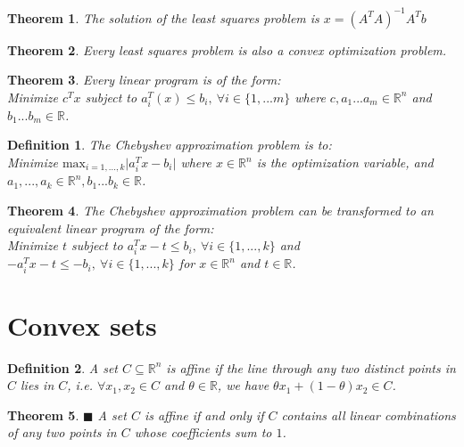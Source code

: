 \documentclass[a4paper]{article}
\newtheorem{mytheorem}{Theorem}
\newtheorem{mydef}{Definition}
\numberwithin{mytheorem}{section}
\numberwithin{mydef}{section}
\numberwithin{example}{section}
\newcommand{\done}{$\blacksquare$ }
\begin{document}
\begin{mytheorem} The solution of the least squares problem is $x = (A^{T}A)^{-1}A^{T}b$ \end{mytheorem}

\begin{mytheorem} Every least squares problem is also a convex optimization problem. \end{mytheorem}

\begin{mytheorem} Every linear program is of the form: \\
Minimize $c^{T}x$ subject to $a^{T}_{i}(x) \leq b_{i}, \ \forall i \in \{1,...m\}$ where $c,a_{1}...a_{m} \in \mathbb{R}^{n}$ and $b_{1}...b_{m} \in \mathbb{R}$. 
\end{mytheorem}

\begin{mydef} The Chebyshev approximation problem is to: \\
Minimize $\text{max}_{i=1,...,k} \lvert a^{T}_{i}x-b_{i}\rvert$ where $x \in \mathbb{R}^{n}$ is the optimization variable, and $a_{1},...,a_{k} \in \mathbb{R}^{n},b_{1}...b_{k} \in \mathbb{R}$.
\end{mydef}

\begin{mytheorem} The Chebyshev approximation problem can be transformed to an equivalent linear program of the form: \\
Minimize $t$ subject to $a^{T}_{i}x - t \leq b_{i}, \ \forall i \in \{ 1,...,k\}$ and $-a^{T}_{i}x - t \leq -b_{i}, \ \forall i \in \{ 1,...,k\}$ for $x \in \mathbb{R}^{n}$ and $t \in \mathbb{R}$.
\end{mytheorem}


\section{Convex sets}

\begin{mydef} A set $C \subseteq \mathbb{R}^{n}$ is affine if the line through any two distinct points in $C$ lies in $C$, i.e. $\forall x_{1},x_{2} \in C$ and $\theta \in \mathbb{R}$, we have $\theta x_{1} + (1-\theta)x_{2} \in C$.
\end{mydef}

\begin{mytheorem} \done A set $C$ is affine if and only if $C$ contains all linear combinations of any two points in $C$ whose coefficients sum to $1$. \end{mytheorem}
\end{document}
